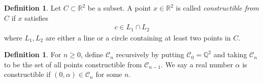 \documentclass[12pt]{report}
\theoremstyle{plain}
\theoremstyle{remark}
\theoremstyle{definition}
\newtheorem{definition}[theorem]{Definition}
\newcommand{\Q}{\mathbb{Q}}
\newcommand{\R}{\mathbb{R}}
\begin{document}
\begin{definition}
    Let $C\subset\R^2$ be a subset. A point $x\in \R^2$ is called \emph{constructible from $C$} if $x$ satisfies
    \begin{align*}
        c\in L_1\cap L_2
    \end{align*}
    where $L_1, L_2$ are either a line or a circle containing at least two points in $C$.
\end{definition}

\begin{definition}
    For $n\ge 0$, define $\mathcal{C}_n$ recursively by putting $\mathcal{C}_0=\Q^2$ and taking $\mathcal{C}_n$ to be the set of all points constructible from $\mathcal{C}_{n-1}$. We say a real number $\alpha$ is constructible if $(0,\alpha)\in \mathcal{C}_n$ for some $n$.
\end{definition}
\end{document}
